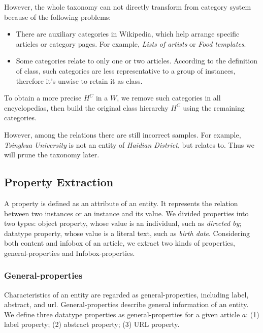 \documentclass[runningheads,a4paper]{llncs}
\begin{document}
However, the whole taxonomy can not directly transform from category system because of the following problems:
\begin{itemize}
    \item There are auxiliary categories in Wikipedia, which help arrange specific articles or category pages. For example, \emph{Lists of artists} or \emph{Food templates}.
    \item Some categories relate to only one or two articles. According to the definition of class, such categories are less representative to a group of instances, therefore it's unwise to retain it as class.
\end{itemize}

   To obtain a more precise $H^C$ in a $W$, we remove such categories in all encyclopedias, then build the original class hierarchy $H^C$ using the remaining categories.

However, among the relations there are still incorrect samples. For example, \emph{Tsinghua University} is not an entity of \emph{Haidian District}, but relates to. Thus we will prune the taxonomy later.

\subsection{Property Extraction}
\label{sec:pe}
A property is defined as an attribute of an entity. It represents the relation between two instances or an instance and its value. We divided properties into two types: object property, whose value is an individual, such as \emph{directed by}; datatype property, whose value is a literal text, such as \emph{birth date}. Considering both content and infobox of an article, we extract two kinds of properties, general-properties and Infobox-properties.

\subsubsection{General-properties}
Characteristics of an entity are regarded as general-properties, including label, abstract, and url. General-properties describe general information of an entity. We define three datatype properties as general-properties for a given article $a$: (1) label property; (2) abstract property; (3) URL property.
\end{document}
